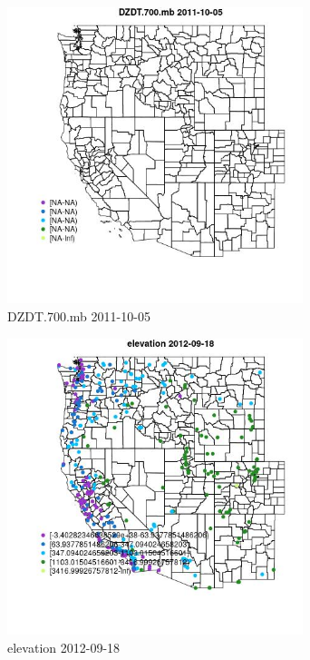 \begin{figure} 
\centering  
\includegraphics[width=0.77\textwidth]{Code_Outputs/ML_input_report_ML_input_PM25_Step5_part_d_de_duplicated_aves_ML_input_MapObsDZDT700mb2011-10-05.jpg} 
\caption{\label{fig:ML_input_report_ML_input_PM25_Step5_part_d_de_duplicated_aves_ML_inputMapObsDZDT700mb2011-10-05}DZDT.700.mb 2011-10-05} 
\end{figure} 
 

\begin{figure} 
\centering  
\includegraphics[width=0.77\textwidth]{Code_Outputs/ML_input_report_ML_input_PM25_Step5_part_d_de_duplicated_aves_ML_input_MapObselevation2012-09-18.jpg} 
\caption{\label{fig:ML_input_report_ML_input_PM25_Step5_part_d_de_duplicated_aves_ML_inputMapObselevation2012-09-18}elevation 2012-09-18} 
\end{figure} 
 

